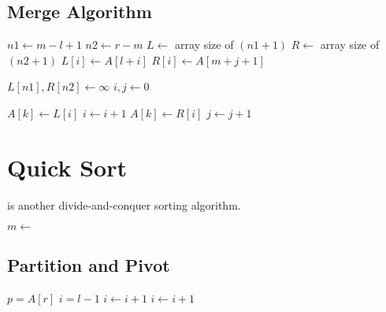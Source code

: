 \documentclass{report}
\begin{document}
\subsection{Merge Algorithm}

\noindent \dotfill
\begin{algorithmic}[1]
   
    \State $n1 \gets m - l + 1$
    \State $n2 \gets r - m$
    \State $L \gets$ array size of $(n1 + 1)$
    \State $R \gets$ array size of $(n2 + 1)$
      \State $L[i] \gets A[l + i]$
    \EndFor
      \State $R[i] \gets A[m + j + 1]$
    \EndFor
    \item[]
    \State $L[n1], R[n2] \gets \infty$
    \State $i, j \gets 0$
    \item[]
        \State $A[k] \gets L[i]$
        \State $i \gets i + 1$
      \Else
        \State $A[k] \gets R[i]$
        \State $j \gets j + 1$
      \EndIf
    \EndFor
  \State {}
  \EndFunction
\end{algorithmic}
\noindent \dotfill

\section{Quick Sort}

 is another divide-and-conquer sorting algorithm.

\noindent \hrulefill
\begin{algorithmic}[0]
   
      \State $m \gets$ 
      \State {}
      \State {}
    \EndIf
    \State {}
  \EndFunction
\end{algorithmic}
\noindent \hrulefill

\subsection{Partition and Pivot}

\noindent \hrulefill
\begin{algorithmic}[0]
   
    \State $p = A[r]$
    \State $i = l - 1$
        \State $i \gets i + 1$
        \State {}
      \EndIf
    \EndFor
    \State $i \gets i + 1$
    \State {}
    \State {}
  \EndFunction
\end{algorithmic}
\noindent \hrulefill
\end{document}
